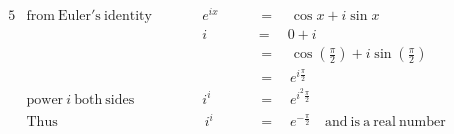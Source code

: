 \begin{alignat*}{5}
&\mathrm{from~Euler's~identity}&&\qquad e^{ix}\quad&&\,=\quad\cos{x}+i\sin{x}\\
&\,&&\qquad i\quad&&=\quad0+i\\
&\,&&\,\quad&&\,=\quad\cos{\left(\frac{\pi}{2}\right)}+i\sin{\left(\frac{\pi}{2}\right)}\\
&\,&&\,\quad&&\,=\quad e^{i\frac{\pi}{2}}\\
&\mathrm{power}~i~\mathrm{both~sides}&&\qquad i^i\quad&&\,=\quad e^{i^2\frac{\pi}{2}}\\
&\mathrm{Thus}&&\,\qquad i^i\quad&&\,=\quad e^{-\frac{\pi}{2}}\quad\mathrm{and~is~a~real~number}\\
\end{alignat*}
